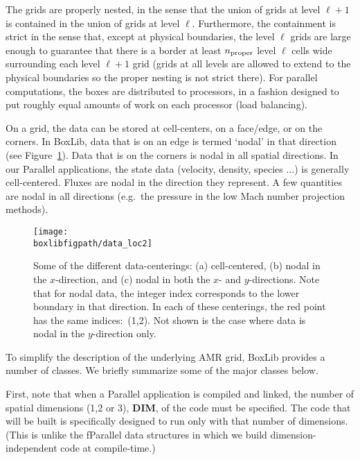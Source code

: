 The grids are properly nested, in the sense that the union of grids
at level $\ell+1$ is contained in the union of grids at level $\ell$.
Furthermore, the containment is strict in the sense that,
except at physical boundaries,
the level $\ell$ grids are large enough to guarantee that there is
a border at least $n_{\rm proper}$ level $\ell$ cells wide surrounding each level
$\ell +1$ grid (grids at all levels are allowed to extend to the physical
boundaries so the proper nesting is not strict there).
For parallel computations, the boxes are distributed to processors, in
a fashion designed to put roughly equal amounts of work on each
processor (load balancing).

On a grid, the data can be stored at cell-centers, on a face/edge, or
on the corners.  In BoxLib, data that is on an edge is termed `nodal'
in that direction (see Figure~\ref{fig:dataloc}).  Data that is on the
corners is nodal in all spatial directions.  In our Parallel applications, 
the state data (velocity, density, species $\ldots$) is generally
cell-centered.  Fluxes are nodal in the direction they represent.
A few quantities are nodal in all directions (e.g.\ the pressure in
the low Mach number projection methods).

\begin{figure}[h]
\centering
\texttt{[image: \\boxlibfigpath/data\_loc2]}
\caption[Data-centerings on the grid]
  {\label{fig:dataloc} Some of the different data-centerings:
  (a) cell-centered, (b) nodal in the $x$-direction, and (c) nodal in
  both the $x$- and $y$-directions.  Note that for nodal data, the
  integer index corresponds to the lower boundary in that direction.
  In each of these centerings, the red point has the same indices:\ (1,2).
  Not shown is the case where data is nodal in the $y$-direction only.}
\end{figure}

To simplify the description of the underlying AMR grid, BoxLib
provides a number of classes.  We briefly summarize some of the major
classes below.

First, note that when a Parallel application is compiled and linked,
the number of spatial dimensions (1,2 or 3), {\bf DIM},
 of the code must be specified.  The code that will be
built is specifically designed to run only with that number of dimensions.
(This is unlike the fParallel data structures in which we build
dimension-independent code at compile-time.)

\subsection{\IVtype}

